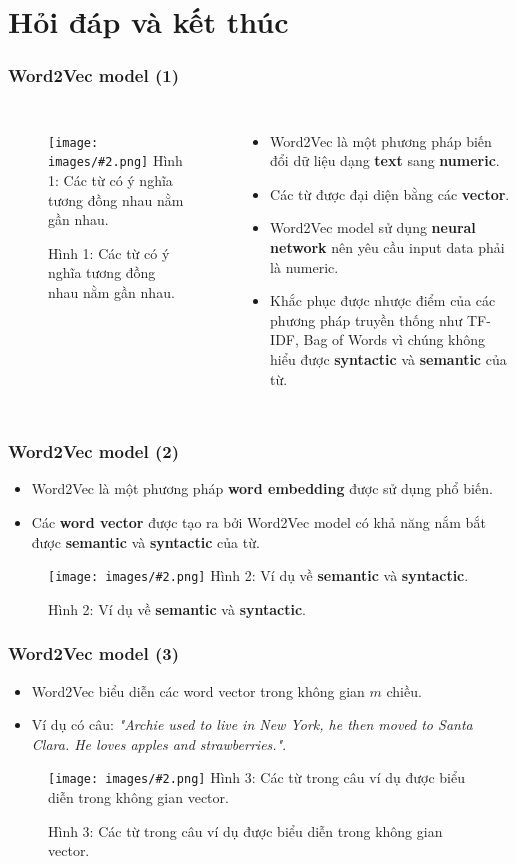 \documentclass[aspectratio=169]{beamer}
\newcommand{\includeImage}[3]{
\begin{figure}[H]
    \centering
    \texttt{[image: images/\#2.png]}
    \def\temp{#3}\ifx\temp\empty\else\caption{#3}\fi
\end{figure}}
\begin{document}
\section{Hỏi đáp và kết thúc}


\begin{frame}
    \frametitle{Word2Vec model (1)}
    \begin{columns}
            \includeImage{0.9}{01}{\centering Hình 1: Các từ có ý nghĩa tương đồng nhau nằm gần nhau.}
        \begin{itemize}
            \item Word2Vec là một phương pháp biến đổi dữ liệu dạng \textbf{text} sang \textbf{numeric}.
            \item Các từ được đại diện bằng các \textbf{vector}.
            \item Word2Vec model sử dụng \textbf{neural network} nên yêu cầu input data phải là numeric.
            \item Khắc phục được nhược điểm của các phương pháp truyền thống như TF-IDF, Bag of Words vì chúng không hiểu được \textbf{syntactic} và \textbf{semantic} của từ.
        \end{itemize}
    \end{columns}
\end{frame}

\begin{frame}
    \frametitle{Word2Vec model (2)}
    \begin{itemize}
        \item Word2Vec là một phương pháp \textbf{word embedding} được sử dụng phổ biến.
        \item Các \textbf{word vector} được tạo ra bởi Word2Vec model có khả năng nắm bắt được \textbf{semantic} và \textbf{syntactic} của từ.
    \end{itemize}

    \includeImage{0.87}{03}{Hình 2: Ví dụ về \textbf{semantic} và \textbf{syntactic}.}
\end{frame}

\begin{frame}
    \frametitle{Word2Vec model (3)}
    \begin{itemize}
        \item Word2Vec biểu diễn các word vector trong không gian $m$ chiều.
        \item Ví dụ có câu: \textsl{"Archie used to live in New York, he then moved to Santa Clara. He loves apples and strawberries."}.
    \end{itemize}

    \includeImage{0.48}{02}{Hình 3: Các từ trong câu ví dụ được biểu diễn trong không gian vector.}
\end{frame}
\end{document}
